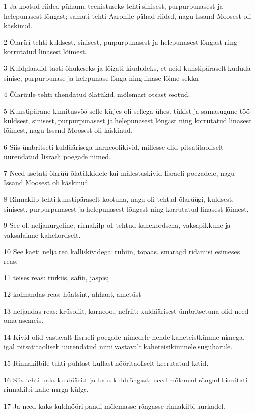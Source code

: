 \par 1 Ja kootud riided pühamu teenistuseks tehti sinisest, purpurpunasest ja helepunasest lõngast; samuti tehti Aaronile pühad riided, nagu Issand Moosest oli käskinud.
\par 2 Õlarüü tehti kuldsest, sinisest, purpurpunasest ja helepunasest lõngast ning korrutatud linasest lõimest.
\par 3 Kuldplaadid taoti õhukeseks ja lõigati kiududeks, et neid kunstipäraselt kududa sinise, purpurpunase ja helepunase lõnga ning linase lõime sekka.
\par 4 Õlarüüle tehti ühendatud õlatükid, mõlemast otsast seotud.
\par 5 Kunstipärane kinnitusvöö selle küljes oli sellega ühest tükist ja samasugune töö kuldsest, sinisest, purpurpunasest ja helepunasest lõngast ning korrutatud linasest lõimest, nagu Issand Moosest oli käskinud.
\par 6 Siis ümbritseti kuldäärisega karneoolikivid, millesse olid pitsatitaoliselt uurendatud Iisraeli poegade nimed.
\par 7 Need asetati õlarüü õlatükkidele kui mälestuskivid Iisraeli poegadele, nagu Issand Moosest oli käskinud.
\par 8 Rinnakilp tehti kunstipäraselt kootuna, nagu oli tehtud õlarüügi, kuldsest, sinisest, purpurpunasest ja helepunasest lõngast ning korrutatud linasest lõimest.
\par 9 See oli neljanurgeline; rinnakilp oli tehtud kahekordsena, vaksapikkune ja vaksalaiune kahekordselt.
\par 10 See kaeti nelja rea kalliskividega: rubiin, topaas, smaragd ridamisi esimeses reas;
\par 11 teises reas: türkiis, safiir, jaspis;
\par 12 kolmandas reas: hüatsint, ahhaat, ametüst;
\par 13 neljandas reas: krüsoliit, karneool, nefriit; kuldäärisest ümbritsetuna olid need oma asemeis.
\par 14 Kivid olid vastavalt Iisraeli poegade nimedele nende kaheteistkümne nimega, igal pitsatitaoliselt uurendatud nimi vastavalt kaheteistkümnele suguharule.
\par 15 Rinnakilbile tehti puhtast kullast nööritaoliselt keerutatud ketid.
\par 16 Siis tehti kaks kuldäärist ja kaks kuldrõngast; need mõlemad rõngad kinnitati rinnakilbi kahe nurga külge.
\par 17 Ja need kaks kuldnööri pandi mõlemasse rõngasse rinnakilbi nurkadel.

